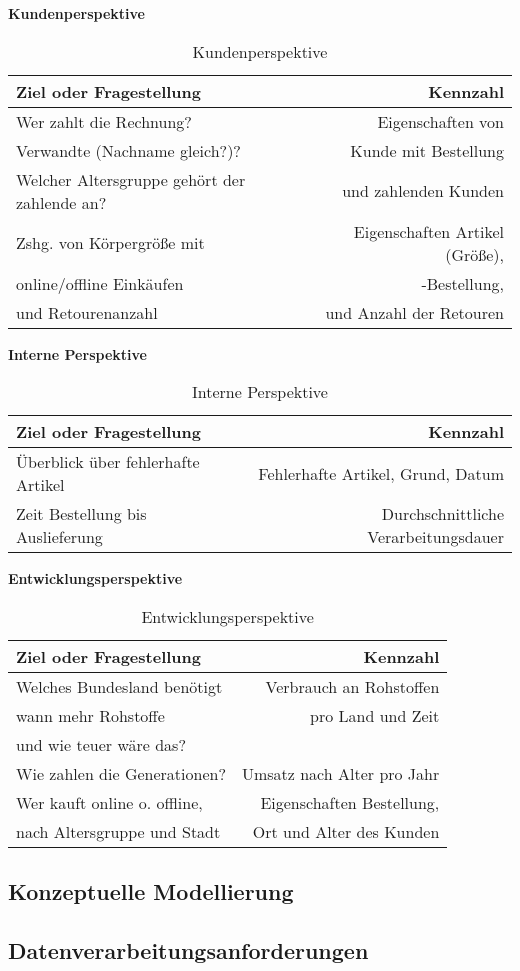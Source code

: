 \begin{table}[h]
\textbf{Kundenperspektive}
\begin{center}
  \begin{tabular}{ | l | r | }
    \hline
    \textbf{Ziel oder Fragestellung} & \textbf{Kennzahl} \\ \hline
	Wer zahlt die Rechnung? & Eigenschaften von \\ Verwandte (Nachname gleich?)? & Kunde mit Bestellung \\ Welcher Altersgruppe gehört der zahlende an? & und zahlenden Kunden
    \\ \hline
    Zshg. von Körpergröße mit & Eigenschaften Artikel (Größe), \\ online/offline Einkäufen & -Bestellung, \\ und Retourenanzahl & und Anzahl der Retouren \\ \hline
  \end{tabular}
\end{center}
\caption{Kundenperspektive}
\label{table:tableKunde}
\end{table}

\begin{table}[h]
\textbf{Interne Perspektive}
\begin{center}
  \begin{tabular}{ | l | r | }
    \hline
    \textbf{Ziel oder Fragestellung} & \textbf{Kennzahl} \\ \hline
    Überblick über fehlerhafte Artikel & Fehlerhafte Artikel, Grund, Datum \\
    \hline
    Zeit Bestellung bis Auslieferung  & Durchschnittliche Verarbeitungsdauer \\ \hline
  \end{tabular}
\end{center}
\caption{Interne Perspektive}
\label{table:tableIntern}
\end{table}

\begin{table}[h]
\textbf{Entwicklungsperspektive}
\begin{center}
  \begin{tabular}{ | l | r | }
    \hline
    \textbf{Ziel oder Fragestellung} & \textbf{Kennzahl} \\ \hline
    Welches Bundesland benötigt & Verbrauch an Rohstoffen \\ wann mehr Rohstoffe &  pro Land und Zeit \\ und wie teuer wäre das? & \\ \hline
    Wie zahlen die Generationen? & Umsatz nach Alter pro Jahr \\ \hline
    Wer kauft online o. offline, & Eigenschaften Bestellung, \\ nach Altersgruppe und Stadt & Ort und Alter des Kunden \\ \hline 
  \end{tabular}
\end{center}
\caption{Entwicklungsperspektive}
\label{table:tableEntwicklung}
\end{table}

\subsection{Konzeptuelle Modellierung}
\label{ref:modellierung}

\subsection{Datenverarbeitungsanforderungen}
\label{ref:businessSicht}
